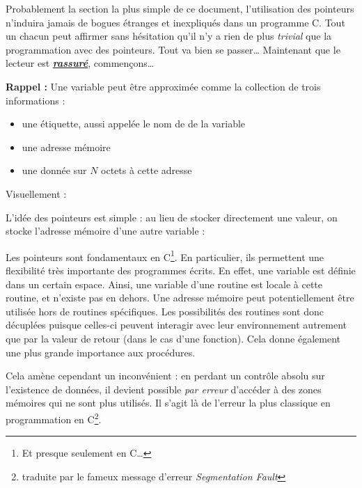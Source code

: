 \documentclass[../../../main.tex]{subfiles}
\begin{document}
Probablement la section la plus simple de ce document, l'utilisation des pointeurs n'induira jamais de bogues étranges et inexpliqués dans un programme C. Tout un chacun peut affirmer sans hésitation qu'il n'y a rien de plus \textit{trivial} que la programmation avec des pointeurs.\newline
Tout va bien se passer\dots\newline
Maintenant que le lecteur est \textbf{\underline{\textit{rassuré}}}, commençons\dots
 
\textbf{Rappel :} Une variable peut être approximée comme la collection de trois informations :
\begin{itemize}
	\item une étiquette, aussi appelée le nom de de la variable
	\item une adresse mémoire
	\item une donnée sur $N$ octets à cette adresse
\end{itemize}
Visuellement : 

\begin{minipage}{\textwidth}
	\begin{center}
		
	\end{center}
\end{minipage} 

L'idée des pointeurs est simple : au lieu de stocker directement une valeur, on stocke l'adresse mémoire d'une autre variable :
 
\begin{minipage}{\textwidth}
	\begin{center}
		
	\end{center}
\end{minipage}
 
Les pointeurs sont fondamentaux en C\footnote{Et presque seulement en C\dots}. En particulier, ils permettent une flexibilité très importante des programmes écrits. En effet, une variable est définie dans un certain espace. Ainsi, une variable d'une routine est locale à cette routine, et n'existe pas en dehors. Une adresse mémoire peut potentiellement être utilisée hors de routines spécifiques. Les possibilités des routines sont donc décuplées puisque celles-ci peuvent interagir avec leur environnement autrement que par la valeur de retour (dans le cas d'une fonction). Cela donne également une plus grande importance aux procédures.

Cela amène cependant un inconvénient : en perdant un contrôle absolu sur l'existence de données, il devient possible \textit{par erreur} d'accéder à des zones mémoires qui ne sont plus utilisés. Il s'agit là de l'erreur la plus classique en programmation en C\footnote{traduite par le fameux message d'erreur \textit{Segmentation Fault}}.
 
\end{document}
